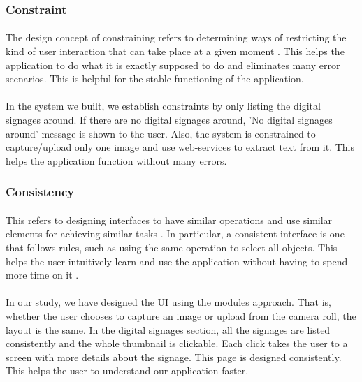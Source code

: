 \documentclass[12pt]{article}
\begin{document}
      \subsubsection{Constraint} 
      
      \paragraph{}The design concept of constraining refers to determining ways of restricting the kind of user interaction that can take place at a given moment \cite{norman}. This helps the application to do what it is exactly supposed to do and eliminates many error scenarios. This is helpful for the stable functioning of the application.
      
      \paragraph{}In the system we built, we establish constraints by only listing the digital signages around. If there are no digital signages around, 'No digital signages around' message is shown to the user. Also, the system is constrained to capture/upload only one image and use web-services to extract text from it. This helps the application function without many errors. 
      
      
      
       \subsubsection{Consistency}
       \paragraph{}This refers to designing interfaces to have similar operations and use similar elements for achieving similar tasks \cite{norman}. In particular, a consistent interface is one that follows rules, such as using the same operation to select all objects. This helps the user intuitively learn and use the application without having to spend more time on it \cite{norman}. 
       
       \paragraph{}In our study, we have designed the UI using the modules approach. That is, whether the user chooses to capture an image or upload from the camera roll, the layout is the same. In the digital signages section, all the signages are listed consistently and the whole thumbnail is clickable. Each click takes the user to a screen with more details about the signage. This page is designed consistently. This helps the user to understand our application faster.
       
\end{document}

